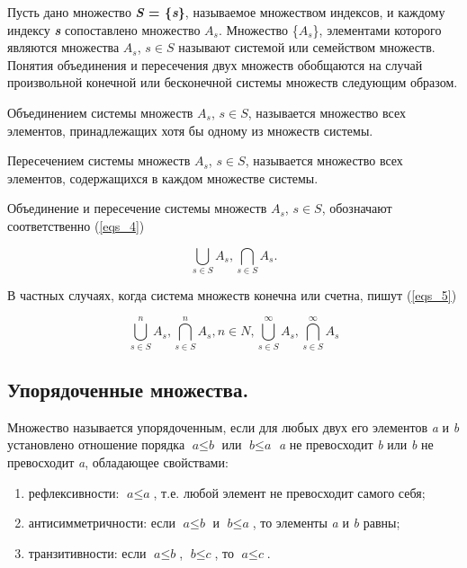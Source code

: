 \documentclass{article}
\begin{document}
    \fontsize{13}{10}\selectfont Пусть дано множество \textbf{\textit{S} = \{\textbf{\textit{s}}\}}, называемое множеством индексов, и каждому индексу \textbf{\textit{s}} сопоставлено множество  \textbf{\textit{$A_s$}}. Множество \{$A_s$\},  элементами которого являются множества \textbf{\textit{$A_s$}}, $s \in S$ называют системой или семейством множеств. Понятия объединения и пересечения двух множеств обобщаются на случай произвольной конечной или бесконечной системы множеств следующим образом.

    Объединением системы множеств $A_s$, $s \in S$, называется множество всех элементов, принадлежащих хотя бы одному из множеств системы.

    Пересечением системы множеств $A_s$, $s \in S$, называется множество всех элементов, содержащихся в каждом множестве системы.

    Объединение и пересечение системы множеств $A_s$, $s \in S$, обозначают соответственно (\ref{eqs_4})

    \begin{equation}
        \label{eqs_4}
        \bigcup_{s \in S} A_s,  \bigcap_{s \in S} A_s.
    \end{equation}

    В частных случаях, когда система множеств конечна или счетна, пишут (\ref{eqs_5})

    \begin{equation}
        \label{eqs_5}
        \bigcup_{s \in S}^{n} A_s,  \bigcap_{s \in S}^{n} A_s, \textit{n} \in \textit{N}, \bigcup_{s \in S}^{\infty} A_s,  \bigcap_{s \in S}^{\infty} A_s
    \end{equation}

    \subsection*{Упорядоченные множества.}

    \fontsize{13}{10}\selectfont Множество называется упорядоченным, если для любых двух его элементов \textit{a} и \textit{b} установлено отношение порядка $\textit{a} \leq \textit{b}$ или $\textit{b} \leq \textit{a}$ \textit{a} не превосходит \textit{b} или \textit{b} не превосходит \textit{a}, обладающее свойствами:

    \begin{enumerate}
        \item рефлексивности: $\textit{a} \leq \textit{a}$, т.е. любой элемент не превосходит
        самого себя;
        \item антисимметричности: если $\textit{a} \leq \textit{b}$ и $\textit{b} \leq \textit{a}$, то элементы \textit{a} и \textit{b} равны;
        \item транзитивности: если $\textit{a} \leq \textit{b}$, $\textit{b} \leq \textit{c}$, то $\textit{a} \leq \textit{c}$.
    \end{enumerate}
\end{document}
